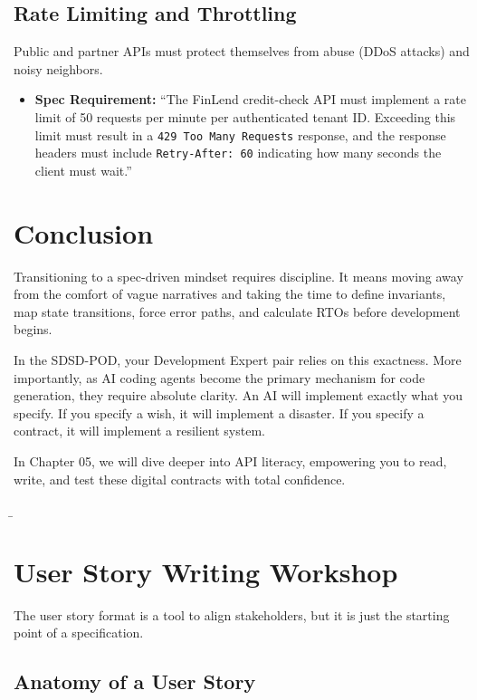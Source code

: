 \documentclass[
  11pt,
  openany,
  oneside]{book}
\providecommand{\tightlist}{%
  \setlength{\itemsep}{0pt}\setlength{\parskip}{0pt}}
\begin{document}
\subsection{Rate Limiting and
Throttling}\label{rate-limiting-and-throttling}

Public and partner APIs must protect themselves from abuse (DDoS
attacks) and noisy neighbors.

\begin{itemize}
\tightlist
\item
  \textbf{Spec Requirement:} ``The FinLend credit-check API must
  implement a rate limit of 50 requests per minute per authenticated
  tenant ID. Exceeding this limit must result in a
  \texttt{429\ Too\ Many\ Requests} response, and the response headers
  must include \texttt{Retry-After:\ 60} indicating how many seconds the
  client must wait.''
\end{itemize}

\section{Conclusion}\label{conclusion-2}

Transitioning to a spec-driven mindset requires discipline. It means
moving away from the comfort of vague narratives and taking the time to
define invariants, map state transitions, force error paths, and
calculate RTOs before development begins.

In the SDSD-POD, your Development Expert pair relies on this exactness.
More importantly, as AI coding agents become the primary mechanism for
code generation, they require absolute clarity. An AI will implement
exactly what you specify. If you specify a wish, it will implement a
disaster. If you specify a contract, it will implement a resilient
system.

In Chapter 05, we will dive deeper into API literacy, empowering you to
read, write, and test these digital contracts with total confidence.

\b

\section{User Story Writing Workshop}\label{user-story-writing-workshop}

The user story format is a tool to align stakeholders, but it is just
the starting point of a specification.

\subsection{Anatomy of a User Story}\label{anatomy-of-a-user-story}
\end{document}
